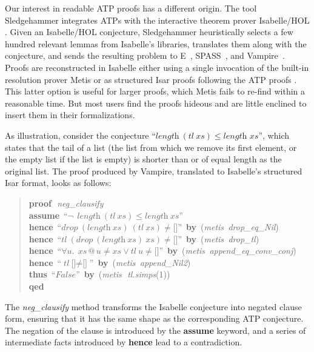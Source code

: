 \documentclass[withtimes,a4paper,12pt]{easychair}
\newcommand\keyw[1]{\textsf{\textbf{#1}}}
\begin{document}
Our interest in readable ATP proofs has a different origin. The tool
Sledgehammer \cite{meng-paulson-2008,paulson-susanto-2007} integrates
ATPs with the interactive theorem prover Isabelle/HOL
\cite{nipkow-et-al-2002}. Given an Isabelle/HOL conjecture,
Sledgehammer heuristically selects a few hundred relevant lemmas from
Isabelle's libraries, translates them along with the conjecture, and
sends the resulting problem to E~\cite{schulz-2004},
SPASS~\cite{weidenbach-2001}, and
Vampire~\cite{riazanov-voronkov-2002}.
%
Proofs are reconstructed in Isabelle either using a single invocation
of the built-in resolution prover Metis \cite{hurd-2003} or as
structured Isar \cite{wenzel-2007} proofs following the ATP proofs
\cite{paulson-susanto-2007}. This latter option is useful for larger
proofs, which Metis fails to re-find within a reasonable time. But
most users find the proofs hideous and are little enclined to
insert them in their formalizations.

As illustration, consider the conjecture ``$\textit{length}~(\textit{tl}~\textit{xs}) \le
\textit{length~xs}$'', which states that the tail of a list (the list from which
we remove its first element, or the empty list if the list is empty) is shorter
than or of equal length as the original list. The proof produced by Vampire,
translated to Isabelle's structured Isar format, looks as follows:
%
\begin{quote}
\keyw{proof}\,~\textit{neg\_clausify} \\
\hbox{}\quad \keyw{assume}\, ``$\lnot\;\, \textit{length}~(\textit{tl}~\textit{xs}) \le \textit{length}~\textit{xs}$''\\
\hbox{}\quad \keyw{hence}\, ``$\textit{drop}~(\textit{length}~\textit{xs})~(\textit{tl}~\textit{xs}) \not= \text{[]}$'' \keyw{\,by\,} (\textit{metis\, drop\_eq\_Nil\/})\\
\hbox{}\quad \keyw{hence}\, ``$\textit{tl}~(\textit{drop}~(\textit{length}~\textit{xs})~\textit{xs}) \not= \text{[]}$'' \keyw{\,by\,} (\textit{metis\, drop\_tl\/})\\
\hbox{}\quad \keyw{hence}\, ``$\forall\textit{u}.\;\, \textit{xs} \mathbin{@} \textit{u} \not= \textit{xs} \mathrel{\lor} \textit{tl}~\textit{u} \not= \text{[]}$'' \keyw{\,by\,} (\textit{metis\, append\_eq\_conv\_conj\/})\\
\hbox{}\quad \keyw{hence}\, ``$\textit{tl}~\text{[]} \not= \text{[]}$'' \keyw{\,by\,} (\textit{metis\, append\_Nil2\/})\\
\hbox{}\quad \keyw{thus}\, ``$\textit{False}$'' \keyw{\,by\,} (\textit{metis}\,~\textit{tl.simps\/}(1))\\
\keyw{qed}
\end{quote}
%
\noindent
The \textit{neg\_clausify} method transforms the Isabelle conjecture into
negated clause form, ensuring that it has the same shape as the corresponding ATP
conjecture. The negation of the clause is introduced by the
\keyw{assume} keyword, and a series of intermediate facts introduced by
\keyw{hence} lead to a contradiction.
\end{document}
